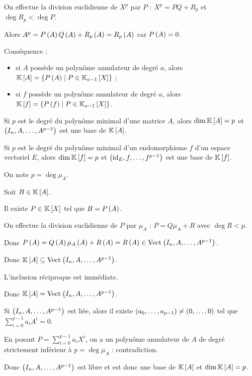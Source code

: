 \begin{dem}
On effectue la division euclidienne de \(X^p\) par \(P\) : \(X^p=PQ+R_p\) et \(\deg R_p<\deg P\).

Alors \(A^p=P\left(A\right)Q\left(A\right)+R_p\left(A\right)=R_p\left(A\right)\) car \(P\left(A\right)=0\).
\end{dem}

Conséquence :

\begin{itemize}
    \item si \(A\) possède un polynôme annulateur de degré \(a\), alors \(\poly[\K][A]=\accol{P\paren{A}\tq P\in\polydeg{a-1}}\) ; \\
    \item si \(f\) possède un polynôme annulateur de degré \(a\), alors \(\poly[\K][f]=\accol{P\paren{f}\tq P\in\polydeg{a-1}}\).
\end{itemize}

\begin{prop}
Si \(p\) est le degré du polynôme minimal d'une matrice \(A\), alors \(\dim\poly[\K][A]=p\) et \(\left(I_n,A,\dots,A^{p-1}\right)\) est une base de \(\poly[\K][A]\).

Si \(p\) est le degré du polynôme minimal d'un endomorphisme \(f\) d'un espace vectoriel \(E\), alors \(\dim\poly[\K][f]=p\) et \(\left(\mathrm{id}_{E},f,\dots,f^{p-1}\right)\) est une base de \(\poly[\K][f]\).
\end{prop}

\begin{dem}
On note \(p=\deg\mu_A\).

Soit \(B\in\poly[\K][A]\).

Il existe \(P\in\poly\) tel que \(B=P\left(A\right)\).

On effectue la division euclidienne de \(P\) par \(\mu_A\) : \(P=Q\mu_A+R\) avec \(\deg R<p\).

Donc \(P\paren{A}=Q\paren{A}\mu_A\paren{A}+R\paren{A}=R\paren{A}\in\Vect{I_n,A,\dots,A^{p-1}}\).

Donc \(\poly[\K][A]\subset\Vect{I_n,A,\dots,A^{p-1}}\).

L'inclusion réciproque est immédiate.

Donc \(\poly[\K][A]=\Vect{I_n,A,\dots,A^{p-1}}\).

Si \(\left(I_n,A,\dots,A^{p-1}\right)\) est liée, alors il existe \(\left(a_0,\dots,a_{p-1}\right)\not=\left(0,\dots,0\right)\) tel que \(\sum_{i=0}^{p-1}a_iA^i=0\).

En posant \(P=\sum_{i=0}^{p-1}a_iX^i\), on a un polynôme annulateur de \(A\) de degré strictement inférieur à \(p=\deg\mu_A\) : contradiction.

Donc \(\left(I_n,A,\dots,A^{p-1}\right)\) est libre et est donc une base de \(\poly[\K][A]\) et \(\dim\poly[\K][A]=p\).
\end{dem}

